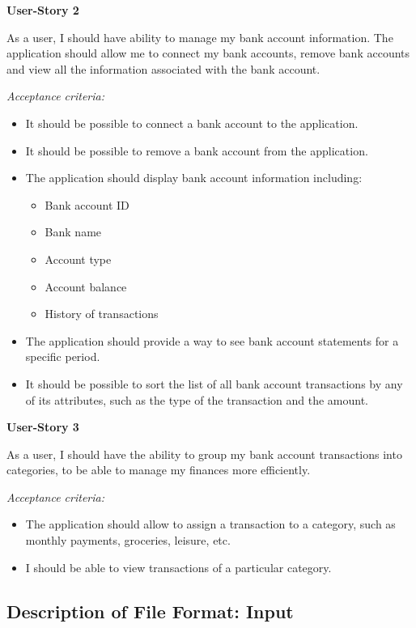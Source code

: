 \documentclass[11pt]{article}
\newcounter{use case ID}
\begin{document}
\clearpage

\textbf{User-Story 2}

As a user, I should have ability to manage my bank account information. The application should allow me to connect my bank accounts, remove bank accounts and view all the information associated with the bank account.

\textit{Acceptance criteria:}
\begin{itemize}
	\item It should be possible to connect a bank account to the application.
	\item It should be possible to remove a bank account from the application.
	\item The application should display bank account information including:
	\begin{itemize}
		\item Bank account ID
	    \item  Bank name
		\item Account type
		\item Account balance
		\item History of transactions
	\end{itemize}
	\item The application should provide a way to see bank account statements for a specific period.
	\item It should be possible to sort the list of all bank account transactions by any of its attributes, such as the type of the transaction and the amount.
\end{itemize}

\textbf{User-Story 3}

As a user, I should have the ability to group my bank account transactions into categories, to be able to manage my finances more efficiently.

\textit{Acceptance criteria:}
\begin{itemize}
	\item The application should allow to assign a transaction to a category, such as monthly payments, groceries, leisure, etc.
	\item I should be able to view transactions of a particular category. 
\end{itemize}

\subsection{Description of File Format: Input}
\end{document}
